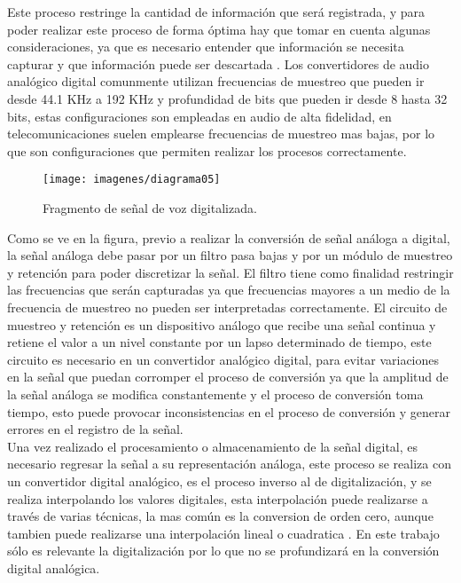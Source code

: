 Este proceso restringe la cantidad de informaci\'on que ser\'a registrada, y para poder realizar este proceso de forma \'optima hay que tomar en cuenta algunas consideraciones, ya que es necesario entender que informaci\'on se necesita capturar y que informaci\'on puede ser descartada \cite{smith}. Los convertidores de audio anal\'ogico digital comunmente utilizan frecuencias de muestreo que pueden ir desde 44.1 KHz a 192 KHz y profundidad de bits que pueden ir desde 8 hasta 32 bits, estas configuraciones son empleadas en audio de alta fidelidad, en telecomunicaciones suelen emplearse frecuencias de muestreo mas bajas, por lo que son configuraciones que permiten realizar los procesos correctamente.\\

\begin{figure}[H]
	\begin{center}
	\texttt{[image: imagenes/diagrama05]} \\
	\caption{Fragmento de señal de voz digitalizada.}
	\label{fig:diag_recon_locutor}
	\end{center}
\end{figure}

Como se ve en la figura, previo a realizar la conversi\'on de señal an\'aloga a digital,  la señal an\'aloga debe pasar por un filtro pasa bajas y por un m\'odulo de muestreo y retenci\'on para poder discretizar la señal. El filtro tiene como finalidad restringir las frecuencias que ser\'an capturadas ya que frecuencias mayores a un medio de la frecuencia de muestreo no pueden ser interpretadas correctamente. El circuito de muestreo y retenci\'on es un dispositivo an\'alogo que recibe una señal continua y retiene el valor a un nivel constante por un lapso determinado de tiempo, este circuito es necesario en un convertidor anal\'ogico digital, para evitar variaciones en la señal que puedan corromper el proceso de conversi\'on ya que la amplitud de la señal an\'aloga se modifica constantemente y el proceso de conversi\'on toma tiempo, esto puede provocar inconsistencias en el proceso de conversi\'on y generar errores en el registro de la señal.\\

Una vez realizado el procesamiento o almacenamiento de la señal digital, es necesario regresar la señal a su representaci\'on an\'aloga, este proceso se realiza con un convertidor digital anal\'ogico, es el proceso inverso al de digitalizaci\'on, y se realiza interpolando los valores digitales, esta interpolaci\'on puede realizarse a trav\'es de varias t\'ecnicas, la mas com\'un es la conversion de orden cero, aunque tambien puede realizarse una interpolaci\'on lineal o cuadratica \cite{proakis}. En este trabajo s\'olo es relevante la digitalizaci\'on por lo que no se profundizar\'a en la conversi\'on digital anal\'ogica.\\


